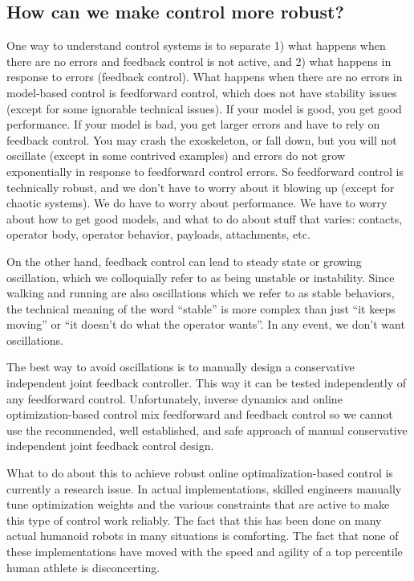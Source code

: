 \documentclass[letterpaper,12pt,fullpage]{article}
\begin{document}
\subsection{How can we make control more robust?}

One way to understand control systems is to separate 1) what happens when there
are no errors and feedback control is not active, and 2) what happens in response
to errors (feedback control). 
What happens when there are no errors in model-based control is 
feedforward control, which does not have stability issues (except for some ignorable
technical issues). If your model is good, you get good performance. If your
model is bad, you get larger errors and have to rely on feedback control.
You may crash the exoskeleton, or fall down, but you will not oscillate
(except in some contrived examples) and errors do not grow exponentially in
response to feedforward control errors.
So feedforward control is technically robust,  
and we don't have to worry about it blowing up (except for chaotic systems).
We do have to worry about performance.
We have
to worry about how to get good models, and what to do about stuff that varies:
contacts, operator body, operator behavior, payloads, attachments, etc.

On the other hand, feedback control can lead to steady state or growing
oscillation, which we colloquially refer to as being unstable or instability.
Since walking and running are also oscillations which we refer to as stable
behaviors, the technical meaning of the word ``stable'' is more complex than
just ``it keeps moving'' or ``it doesn't do what the operator wants''.
In any event, we don't want oscillations.

The best way to avoid oscillations is to manually design a conservative 
independent joint feedback controller.
This way it can be tested independently of any
feedforward control.
Unfortunately, inverse dynamics and online optimization-based control mix
feedforward and feedback control so we cannot use the recommended, well established,
and safe approach of manual conservative independent joint feedback control design. 

What to do about this to achieve robust online optimalization-based control is
currently a research issue. In actual implementations, skilled engineers manually
tune optimization weights and the various constraints that are active to
make this type of control work reliably. The fact that this has been done on many actual
humanoid robots in many situations is comforting. The fact that none of these
implementations have moved with the speed and agility of a top percentile
human athlete is disconcerting.
\end{document}
